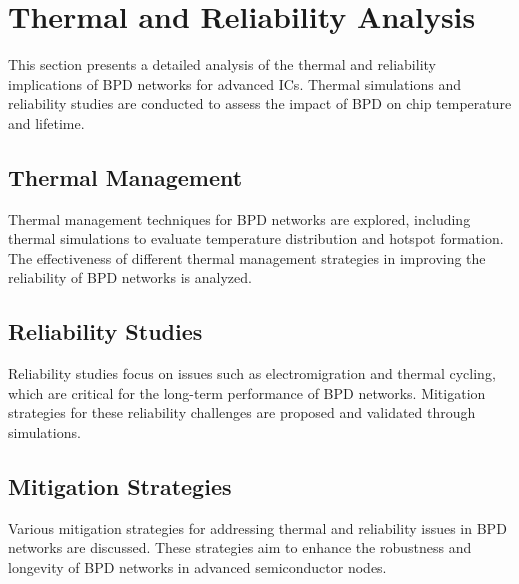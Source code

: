 \section{Thermal and Reliability Analysis}
This section presents a detailed analysis of the thermal and reliability implications of BPD networks for advanced ICs. Thermal simulations and reliability studies are conducted to assess the impact of BPD on chip temperature and lifetime.

\subsection{Thermal Management}
Thermal management techniques for BPD networks are explored, including thermal simulations to evaluate temperature distribution and hotspot formation. The effectiveness of different thermal management strategies in improving the reliability of BPD networks is analyzed.

\subsection{Reliability Studies}
Reliability studies focus on issues such as electromigration and thermal cycling, which are critical for the long-term performance of BPD networks. Mitigation strategies for these reliability challenges are proposed and validated through simulations.

\subsection{Mitigation Strategies}
Various mitigation strategies for addressing thermal and reliability issues in BPD networks are discussed. These strategies aim to enhance the robustness and longevity of BPD networks in advanced semiconductor nodes.
